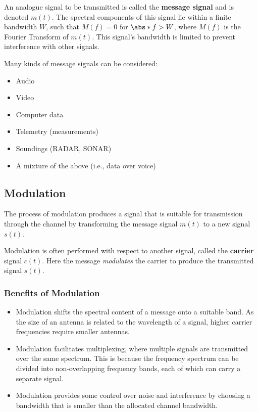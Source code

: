 \documentclass{article}
\begin{document}
An analogue signal to be transmitted is called the \textbf{message
signal} and is denoted \(m\left( t \right)\). The spectral components
of this signal lie within a finite bandwidth \(W\), such that \(M\left(
f \right) = 0\) for \(\abs*{f} > W\), where \(M\left( f \right)\) is
the Fourier Transform of \(m\left( t \right)\). This signal's bandwidth
is limited to prevent interference with other signals.

Many kinds of message signals can be considered:
\begin{itemize}
    \item Audio
    \item Video
    \item Computer data
    \item Telemetry (measurements)
    \item Soundings (RADAR, SONAR)
    \item A mixture of the above (i.e., data over voice)
\end{itemize}
\subsection{Modulation}
The process of modulation produces a signal that is suitable for
transmission through the channel by transforming the message signal
\(m\left( t \right)\) to a new signal \(s\left( t \right)\).

Modulation is often performed with respect to another signal, called
the \textbf{carrier} signal \(c\left( t \right)\). Here the message
\textit{modulates} the carrier to produce the transmitted signal
\(s\left( t \right)\).
\subsubsection{Benefits of Modulation}
\begin{itemize}
    \item Modulation shifts the spectral content of a message onto a
          suitable band. As the size of an antenna is related to the
          wavelength of a signal, higher carrier frequencies require
          smaller antennas.
    \item Modulation facilitates multiplexing, where multiple signals
          are transmitted over the same spectrum. This is because the
          frequency spectrum can be divided into non-overlapping
          frequency bands, each of which can carry a separate signal.
    \item Modulation provides some control over noise and interference
          by choosing a bandwidth that is smaller than the allocated
          channel bandwidth.
\end{itemize}
\end{document}
